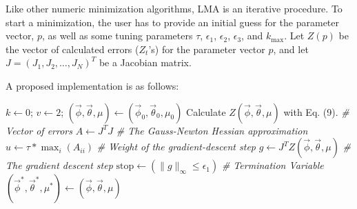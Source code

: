 \documentclass[english,10pt]{llncs}
\begin{document}
Like other numeric minimization algorithms, LMA is an iterative
procedure.  To start a minimization, the user has to provide an
initial guess for the parameter vector, $p$, as well as some tuning
parameters $\tau$, $\epsilon_1$, $\epsilon_2$, $\epsilon_3$, and $k_{\max}$.
Let $Z(p)$ be the vector of calculated errors ($Z_t$'s) for the
parameter vector $p$, and let $J = {(J_{1}, J_{2}, \ldots, J_N)}^T$
be a Jacobian matrix.

A proposed implementation is as follows:

\begin{algorithm}[ht]
    $k \leftarrow 0$; $v \leftarrow 2$;
    $(\vec{\phi},\vec{\theta},\mu) \leftarrow
    (\vec{\phi}_0,\vec{\theta}_0,\mu_0)$\;
    Calculate $Z(\vec{\phi},\vec{\theta},\mu)$ with
    Eq. (9).  \textit{\footnotesize \# Vector of errors}\;
    $A \leftarrow J^T J$   \textit{\footnotesize \# The Gauss-Newton Hessian
    approximation}\;
    $u \leftarrow \tau * \max_i(A_{ii})$ \textit{\footnotesize \# Weight of the
    gradient-descent step}\;
    $g \leftarrow J^T Z(\vec{\phi},\vec{\theta},\mu)$ \textit{\footnotesize \#
    The gradient descent step}\;
	$ \text{stop} \leftarrow (\|g\|_{\infty} \le \epsilon_1)$
    \textit{\footnotesize \# Termination Variable}\;
	$(\vec{\phi}^*,\vec{\theta}^*,\mu^*) \leftarrow (\vec{\phi},\vec{\theta},\mu)$\;


\end{algorithm}
\end{document}
